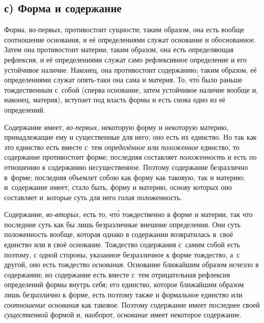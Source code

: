 \subsection[с) Форма и содержание]{с) Форма и содержание}

Форма, во-первых, противостоит сущности; таким образом, она есть вообще
соотношение основания, и её определениями служат основание и обоснованное.
Затем она противостоит материи; таким образом, она есть определяющая рефлексия,
и её определениями служат само рефлексивное определение и его устойчивое
наличие. Наконец, она противостоит содержанию; таким образом, её определениями
служат опять-таки она сама и материя. То, чт\'{о} было раньше тождественным
с~собой (сперва основание, затем устойчивое наличие вообще и, наконец,
материя), вступает под власть формы и есть снова одно из её определений.

Содержание имеет, {\em во-первых,} некоторую форму и некоторую материю,
принадлежащие ему и существенные для него; оно есть их единство. Но так как это
единство есть вместе с~тем {\em определённое} или {\em положенное} единство, то
содержание противостоит форме; последняя составляет {\em положенность} и есть
по отношению к содержанию несущественное. Поэтому содержание безразлично
в~форме; последняя объемлет собою как форму как таковую, так и материю;
и~содержание имеет, стало быть, форму и материю, основу которых оно составляет
и~которые суть для него голая положенность.

Содержание, {\em во-вторых,} есть то, чт\'{о} тождественно в форме и материи,
так что последние суть как бы лишь безразличные внешние определения. Они суть
положенность вообще, которая однако в содержании возвратилась в~своё единство
или в своё основание. Тождество содержания с~самим собой есть поэтому, с одной
стороны, указанное безразличное к форме тождество, а~с другой, оно есть
тождество {\em основания}. Основание ближайшим образом исчезло в содержании; но
содержание есть вместе с~тем отрицательная рефлексия определений формы внутрь
себя; его единство, которое ближайшим образом лишь безразлично к форме, есть
поэтому также и формальное единство или {\em соотношение основания} как
таковое. Поэтому содержание имеет последнее своей {\em существенной} формой и,
наоборот, {\em основание} имеет некоторое содержание.

